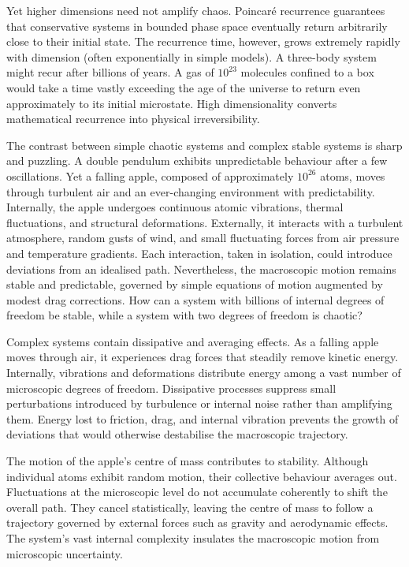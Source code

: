 Yet higher dimensions need not amplify chaos. Poincaré recurrence guarantees that conservative systems in bounded phase space eventually return arbitrarily close to their initial state. The recurrence time, however, grows extremely rapidly with dimension (often exponentially in simple models). A three-body system might recur after billions of years. A gas of $10^{23}$ molecules confined to a box would take a time vastly exceeding the age of the universe to return even approximately to its initial microstate. High dimensionality converts mathematical recurrence into physical irreversibility.

The contrast between simple chaotic systems and complex stable systems is sharp and puzzling. A double pendulum exhibits unpredictable behaviour after a few oscillations. Yet a falling apple, composed of approximately $10^{26}$ atoms, moves through turbulent air and an ever-changing environment with predictability. Internally, the apple undergoes continuous atomic vibrations, thermal fluctuations, and structural deformations. Externally, it interacts with a turbulent atmosphere, random gusts of wind, and small fluctuating forces from air pressure and temperature gradients. Each interaction, taken in isolation, could introduce deviations from an idealised path. Nevertheless, the macroscopic motion remains stable and predictable, governed by simple equations of motion augmented by modest drag corrections. How can a system with billions of internal degrees of freedom be stable, while a system with two degrees of freedom is chaotic?

Complex systems contain dissipative and averaging effects. As a falling apple moves through air, it experiences drag forces that steadily remove kinetic energy. Internally, vibrations and deformations distribute energy among a vast number of microscopic degrees of freedom. Dissipative processes suppress small perturbations introduced by turbulence or internal noise rather than amplifying them. Energy lost to friction, drag, and internal vibration prevents the growth of deviations that would otherwise destabilise the macroscopic trajectory.

The motion of the apple's centre of mass contributes to stability. Although individual atoms exhibit random motion, their collective behaviour averages out. Fluctuations at the microscopic level do not accumulate coherently to shift the overall path. They cancel statistically, leaving the centre of mass to follow a trajectory governed by external forces such as gravity and aerodynamic effects. The system's vast internal complexity insulates the macroscopic motion from microscopic uncertainty.

